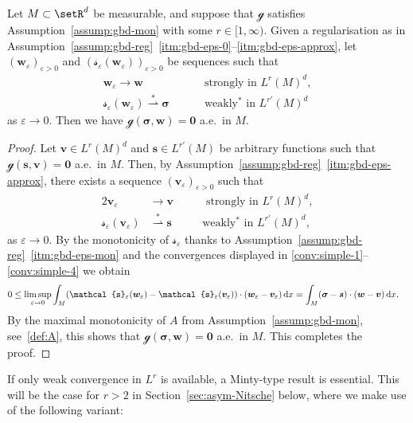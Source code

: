 \documentclass[reqno,a4paper]{amsart}
\def\vec#1{\boldsymbol{#1}}
\def\d{{\rm d}}
\def\dx{\,\d x}
\def\wsconv{\overset{*}{\rightharpoonup}}
\def\b0{\vec{0}}
\def\bs{\vec{s}}
\def\bv{\vec{v}}
\def\bw{\vec{w}}
\def\bsigma{\vec{\sigma}}
\def\gbd{\vec{\mathcal{g}}}
\def\Srel{\vec{\mathcal{s}}}
\def\Seps{\Srel_{\varepsilon}}
\begin{document}
	\begin{lemma}\label{lem:conv-simple}
		Let $M \subset \setR^d$ be measurable, and suppose that $\gbd$ satisfies Assumption~\ref{assump:gbd-mon} with some $r \in [1,\infty)$. 
		Given a regularisation as in Assumption~\ref{assump:gbd-reg}~\ref{itm:gbd-eps-0}--\ref{itm:gbd-eps-approx}, let $(\bw_{\varepsilon})_{\varepsilon >0}$ and $(\Seps(\bw_{\varepsilon}))_{\varepsilon >0}$ be sequences such that 
		\begin{align}\label{conv:simple-1}
			\bw_{\varepsilon} \to  \bw \qquad & \text{ strongly in } L^{r}(M)^d,\\
			\label{conv:simple-2}
			\Seps(\bw_{\varepsilon}) \wsconv  \bsigma \qquad & \text{ weakly$^*$ in } L^{r'}(M)^d
		\end{align}
		as $\varepsilon \to 0$. 
		Then we have $\gbd(\bsigma,\bw) = \b0$ a.e.~in $M$. 
		
	\end{lemma}
	\begin{proof}
		Let $\bv \in L^r(M)^d$ and $\bs \in L^{r'}(M)$ be arbitrary functions such that $\gbd(\bs,\bv)= \b0 $ a.e.~in $M$. 
		Then, by Assumption~\ref{assump:gbd-reg}~\ref{itm:gbd-eps-approx}, there exists a sequence $(\bv_{\varepsilon})_{\varepsilon>0}$ such that
		\begin{alignat}{2}\label{conv:simple-3}
			\bv_{\varepsilon} &\to \bv \quad &&\text{ strongly in } L^{r}(M)^d,\\ \label{conv:simple-4}
			\Seps(\bv_{\varepsilon}) &\wsconv \bs && \text{weakly$^*$ in } L^{r'}(M)^d, 
		\end{alignat}
		as $\varepsilon \to 0$. 
		By the monotonicity of $\Seps$ thanks to Assumption~\ref{assump:gbd-reg}~\ref{itm:gbd-eps-mon} and the convergences displayed in \eqref{conv:simple-1}--\eqref{conv:simple-4} we obtain 
		\begin{align*}
			0&  \leq \limsup_{\varepsilon \to 0} \int_{M} (\Seps(\bw_{\varepsilon}) - \Seps(\bv_{\varepsilon})) \cdot (\bw_{\varepsilon} - \bv_{\varepsilon})   \dx = 
			\int_{M}  (\bsigma - \bs) \cdot (\bw - \bv)  \dx.
		\end{align*}
		By the maximal monotonicity of $A$ from Assumption~\ref{assump:gbd-mon}, see~\eqref{def:A}, this shows that $\gbd(\bsigma,\bw) = \b0$ a.e.~in $M$. 
		This completes the proof.  
	\end{proof}
	
	If only weak convergence in $L^r$ is available,  a Minty-type result is essential.  
	This will be the case for $r >2$ in Section~\ref{sec:asym-Nitsche} below, where we make use of the following variant: 
	
\end{document}
